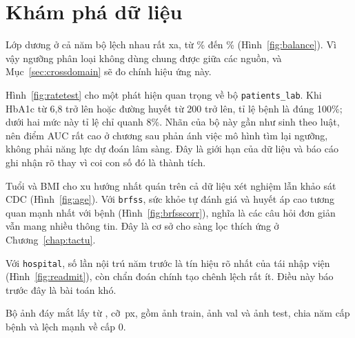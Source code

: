 \section{Khám phá dữ liệu}

Lớp dương ở cả năm bộ lệch nhau rất xa, từ \% đến \% (Hình~\ref{fig:balance}). Vì vậy ngưỡng phân loại không dùng chung được giữa các nguồn, và Mục~\ref{sec:crossdomain} sẽ đo chính hiệu ứng này.


Hình~\ref{fig:ratetest} cho một phát hiện quan trọng về bộ \texttt{patients\_lab}. Khi HbA1c từ 6,8 trở lên hoặc đường huyết từ 200 trở lên, tỉ lệ bệnh là đúng 100\%; dưới hai mức này tỉ lệ chỉ quanh 8\%. Nhãn của bộ này gần như sinh theo luật, nên điểm AUC rất cao ở chương sau phản ánh việc mô hình tìm lại ngưỡng, không phải năng lực dự đoán lâm sàng. Đây là giới hạn của dữ liệu và báo cáo ghi nhận rõ thay vì coi con số đó là thành tích.


Tuổi và BMI cho xu hướng nhất quán trên cả dữ liệu xét nghiệm lẫn khảo sát CDC (Hình~\ref{fig:age}). Với \texttt{brfss}, sức khỏe tự đánh giá và huyết áp cao tương quan mạnh nhất với bệnh (Hình~\ref{fig:brfsscorr}), nghĩa là các câu hỏi đơn giản vẫn mang nhiều thông tin. Đây là cơ sở cho sàng lọc thích ứng ở Chương~\ref{chap:tactu}.



Với \texttt{hospital}, số lần nội trú năm trước là tín hiệu rõ nhất của tái nhập viện (Hình~\ref{fig:readmit}), còn chẩn đoán chính tạo chênh lệch rất ít. Điều này báo trước đây là bài toán khó.


Bộ ảnh đáy mắt lấy từ , cỡ \,px, gồm  ảnh train,  ảnh val và  ảnh test, chia năm cấp bệnh và lệch mạnh về cấp 0.
